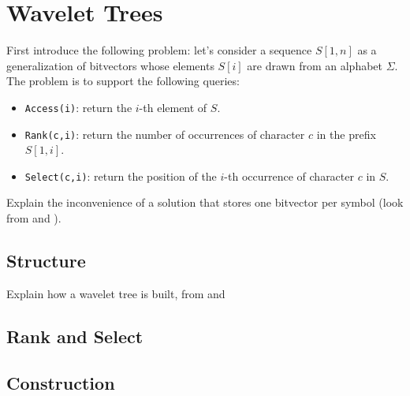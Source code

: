 \clearpage
\section{Wavelet Trees}
First introduce the following problem: let's consider a sequence $S[1,n]$ as a generalization of bitvectors whose elements $S[i]$ are drawn from an alphabet $\Sigma$. The problem is to support the following queries:

\begin{itemize}
    \item \texttt{Access(i)}: return the $i$-th element of $S$.
    \item \texttt{Rank(c,i)}: return the number of occurrences of character $c$ in the prefix $S[1,i]$.
    \item \texttt{Select(c,i)}: return the position of the $i$-th occurrence of character $c$ in $S$.
\end{itemize}

Explain the inconvenience of a solution that stores one bitvector per symbol (look from \citep{navarro2016compact} and \citep{ferragina2023pearls}).

\subsection{Structure}

Explain how a wavelet tree is built, from \citep{navarro2016compact} and \citep{GrossiWT2003}

\subsection{Rank and Select}

\subsection{Construction}
